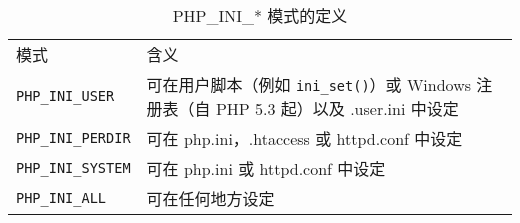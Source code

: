 \begin{table}[htbp]
\centering
\caption{PHP\_INI\_* 模式的定义}
\label{php_ini_*}
\begin{tabular}{m{80pt}m{280pt}}
\hline
模式							&含义\\
\texttt{PHP\_INI\_USER}	 &可在用户脚本（例如 \texttt{ini\_set()}）或 Windows 注册表（自 PHP 5.3 起）以及 .user.ini 中设定\\
\texttt{PHP\_INI\_PERDIR}	&可在 php.ini，.htaccess 或 httpd.conf 中设定\\
\texttt{PHP\_INI\_SYSTEM}	&可在 php.ini 或 httpd.conf 中设定\\
\texttt{PHP\_INI\_ALL}		&可在任何地方设定\\
\end{tabular}
\end{table}


